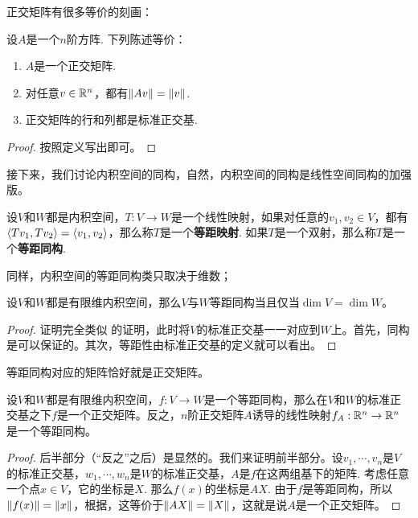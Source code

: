 正交矩阵有很多等价的刻画：

\begin{proposition}\label{prop:orthogonal-matrix}
设$A$是一个$n$阶方阵. 下列陈述等价：
\begin{enumerate}
    \item $A$是一个正交矩阵.
    \item 对任意$v\in\mathbb{R}^n$，都有$\left\|Av\right\|=\left\|v\right\|$. 
    \item 正交矩阵的行和列都是标准正交基.
\end{enumerate}
\end{proposition}
\begin{proof}
    按照定义写出即可。
\end{proof}

接下来，我们讨论内积空间的同构，自然，内积空间的同构是线性空间同构的加强版。

\begin{definition}[等距映射与等距同构]\label{def:isometry}
设$V$和$W$都是内积空间，$T:V\to W$是一个线性映射，如果对任意的$v_1,v_2\in V$，都有$\left\langle{Tv_1},{Tv_2}\right\rangle=\left\langle{v_1},{v_2}\right\rangle$，那么称$T$是一个\textbf{等距映射}. 如果$T$是一个双射，那么称$T$是一个\textbf{等距同构}.
\end{definition}

同样，内积空间的等距同构类只取决于维数；

\begin{theorem}\label{thm:isometry}
设$V$和$W$都是有限维内积空间，那么$V$与$W$等距同构当且仅当$\dim V=\dim W$。
\end{theorem}
\begin{proof}
    证明完全类似 的证明，此时将$V$的标准正交基一一对应到$W$上。首先，同构是可以保证的。其次，等距性由标准正交基的定义就可以看出。
\end{proof}

等距同构对应的矩阵恰好就是正交矩阵。
\begin{proposition}\label{prop:isometry-matrix}
设$V$和$W$都是有限维内积空间，$f:V\to W$是一个等距同构，那么在$V$和$W$的标准正交基之下$f$是一个正交矩阵。反之，$n$阶正交矩阵$A$诱导的线性映射$f_A:\mathbb{R}^n\to\mathbb{R}^n$是一个等距同构。
\end{proposition}
\begin{proof}
    后半部分（“反之”之后）是显然的。我们来证明前半部分。设$v_1,\cdots,v_n$是$V$的标准正交基，$w_1,\cdots,w_n$是$W$的标准正交基，$A$是$f$在这两组基下的矩阵. 考虑任意一个点$x\in V$，它的坐标是$X$. 那么$f(x)$的坐标是$AX$. 由于$f$是等距同构，所以$\left\|f(x)\right\|=\left\|x\right\|$，根据，这等价于$\left\|AX\right\|=\left\|X\right\|$，这就是说$A$是一个正交矩阵。
\end{proof}

